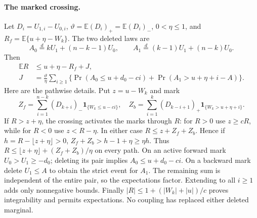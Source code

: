 \documentclass[11pt,a4paper]{article}
\numberwithin{equation}{section}
\theoremstyle{definition}
\theoremstyle{remark}
\begin{document}
\paragraph{The marked crossing.}
Let $D_i=U_{1,i}-U_{0,i}$, $\vartheta=\mathbb E(D_i)_+=\mathbb E(D_i)_-$,
$0<\eta\le1$, and $R_f=\mathbb E\{u+\eta-W_k\}$. The two deleted laws are
\[
 A_0\overset{d}=kU_1+(n-k-1)U_0,\qquad
 A_1\overset{d}=(k-1)U_1+(n-k)U_0.
\]
Then
\begin{align}
 \mathbb ER&\le u+\eta-R_f+J,\label{cut49:shortloc:mark}\\
 J&=\frac{\vartheta}{\eta}\sum_{i\ge1}
 \{\Pr(A_0\le u+d_0-ci)+\Pr(A_1>u+\eta+i-A)\}.\nonumber
\end{align}
Here are the pathwise details. Put $z=u-W_k$ and mark
\[
 Z_f=\sum_{i=1}^{n-k}(D_{k+i})_-\mathbf1_{\{W_k\le u-ci\}},\quad
 Z_b=\sum_{i=1}^{k}(D_{k-i+1})_+\mathbf1_{\{W_k>u+\eta+i\}}.
\]
If $R>z+\eta$, the crossing activates the marks through $R$: for $R>0$
use $z\ge cR$, while for $R<0$ use $z<R-\eta$. In either case
$R\le z+Z_f+Z_b$. Hence if $h=R-\lfloor z+\eta\rfloor>0$,
$Z_f+Z_b>h-1+\eta\ge\eta h$. Thus
$R\le\lfloor z+\eta\rfloor+(Z_f+Z_b)/\eta$ on every path.
On an active forward mark $U_0>U_1\ge-d_0$; deleting its pair implies
$A_0\le u+d_0-ci$. On a backward mark delete $U_1\le A$ to obtain the
strict event for $A_1$. The remaining sum is independent of the entire
pair, so the expectations factor. Extending to all $i\ge1$ adds only
nonnegative bounds. Finally $|R|\le1+(|W_k|+|u|)/c$ proves integrability
and permits expectations. No coupling has replaced either deleted marginal.
\end{document}
